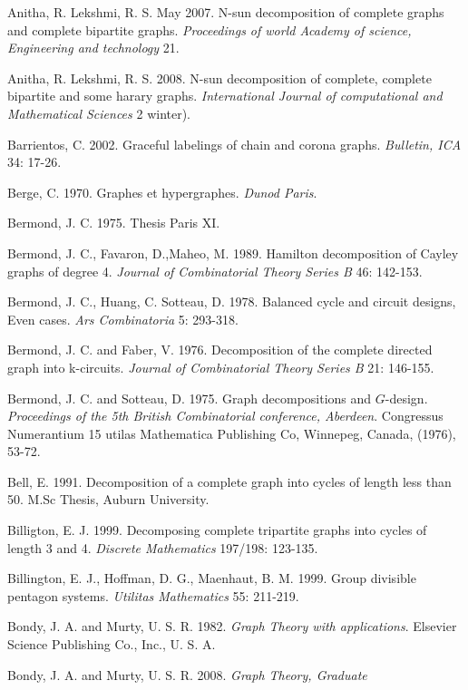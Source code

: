 \documentclass[12pt]{report}
\begin{document}
\begin{newpage}
\begin{description}
\item Anitha, R. Lekshmi, R. S.  May 2007.  N-sun decomposition of
complete graphs and complete bipartite graphs. {\it Proceedings of
world Academy of science, Engineering and technology} 21.
\item Anitha, R. Lekshmi, R. S. 2008. N-sun decomposition of complete,
complete bipartite and some harary graphs. {\it International Journal of computational and Mathematical Sciences }2 winter).
\item Barrientos, C. 2002. Graceful labelings of chain and corona graphs. {\it Bulletin, ICA} 34: 17-26.
\item Berge, C. 1970.  Graphes et hypergraphes. {\it Dunod Paris}.
\item Bermond, J. C. 1975. Thesis Paris XI.
\item Bermond, J. C., Favaron, D.,Maheo, M. 1989. Hamilton decomposition of Cayley graphs of degree 4. {\it Journal of Combinatorial Theory Series B} 46: 142-153.
\item Bermond, J. C., Huang, C. Sotteau, D. 1978. Balanced cycle and
circuit designs, Even cases. {\it Ars Combinatoria} 5: 293-318.
 \item Bermond, J. C. and Faber, V. 1976. Decomposition of the complete directed graph into k-circuits. {\it Journal of Combinatorial Theory Series B} 21: 146-155.
\item Bermond, J. C. and  Sotteau, D. 1975. Graph decompositions and
$G$-design. {\it Proceedings of the 5th British Combinatorial
conference, Aberdeen}.  Congressus Numerantium 15 utilas
Mathematica Publishing Co, Winnepeg, Canada, (1976), 53-72.
\item Bell, E. 1991. Decomposition of a complete graph into cycles of
length less than 50.  M.Sc Thesis, Auburn University.
\item Billigton, E. J. 1999. Decomposing complete tripartite graphs into
cycles of length 3 and 4. {\it Discrete Mathematics} 197/198:  123-135.
\item Billington, E. J., Hoffman, D. G., Maenhaut, B. M. 1999. Group
divisible pentagon systems. {\it Utilitas Mathematics} 55: 211-219.
\item Bondy, J. A. and Murty, U. S. R. 1982. {\it Graph Theory with
applications}. Elsevier Science Publishing Co., Inc., U. S. A.
\item Bondy, J. A. and Murty, U. S. R. 2008. {\it Graph Theory, Graduate
}
\end{description}
\end{newpage}
\end{document}
